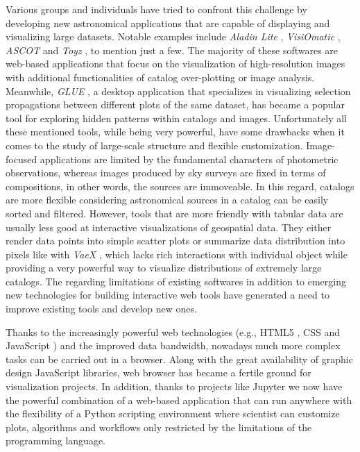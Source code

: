 \documentclass[5p,authoryear]{elsarticle}
\begin{document}
Various groups and individuals have tried to confront this challenge by developing new astronomical applications that are capable of displaying and visualizing large datasets. Notable examples include \textit{Aladin Lite} \citep{AladinLite2014}, \textit{VisiOmatic} \citep{Bertin2015}, \textit{ASCOT} and \textit{Toyz} \citep{Moolekamp2015}, to mention just a few.
The majority of these softwares are web-based applications that focus on the visualization of high-resolution images with additional functionalities of catalog over-plotting or image analysis. Meanwhile, \textit{GLUE} \citep{GlueViz}, a desktop application that specializes in visualizing selection propagations between different plots of the same dataset, has became a popular tool for exploring hidden patterns within catalogs and images.
Unfortunately all these mentioned tools, while being very powerful, have some drawbacks when it comes to the study of large-scale structure and flexible customization.
Image-focused applications are limited by the fundamental characters of photometric observations, whereas images produced by sky surveys are fixed in terms of compositions, in other words, the sources are immoveable. In this regard, catalogs are more flexible considering astronomical sources in a catalog can be easily sorted and filtered.
However, tools that are more friendly with tabular data are usually less good at interactive visualizations of geospatial data.
They either render data points into simple scatter plots or summarize data distribution into pixels like with \textit{VaeX} \citep{vaex}, which lacks rich interactions with individual object while providing a very powerful way to visualize distributions of extremely large catalogs.
The regarding limitations of existing softwares in addition to emerging new technologies for building interactive web tools have generated a need to improve existing tools and develop new ones.

Thanks to the increasingly powerful web technologies (e.g., HTML5 \citep{HTML5}, CSS \citep{CSS} and JavaScript \citep{JS}) and the improved data bandwidth, nowadays much more complex tasks can be carried out in a browser.
Along with the great availability of graphic design JavaScript libraries, web browser has became a fertile ground for visualization projects. In addition, thanks to projects like Jupyter \citep{Jupyter} we now have the powerful combination of a web-based application that can run anywhere with the flexibility of a Python scripting environment where scientist can customize plots, algorithms and workflows only restricted by the limitations of the programming language.
\end{document}
